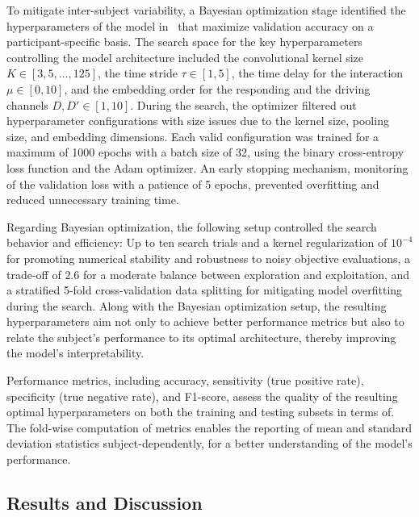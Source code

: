 To mitigate inter-subject variability, a Bayesian optimization stage identified the hyperparameters of the model in~ that maximize validation accuracy on a participant-specific basis. The search space for the key hyperparameters controlling the model architecture included the convolutional kernel size $K\in[3,5,\dots,125]$, the time stride $\tau\in[1,5]$, the time delay for the interaction $\mu\in[0,10]$, and the embedding order for the responding and the driving channels $D,D'\in[1,10]$. During the search, the optimizer filtered out hyperparameter configurations with size issues due to the kernel size, pooling size, and embedding dimensions. Each valid configuration was trained for a maximum of 1000 epochs with a batch size of 32, using the binary cross-entropy loss function and the Adam optimizer. An early stopping mechanism, monitoring of the validation loss with a patience of 5 epochs, prevented overfitting and reduced unnecessary training time.

Regarding Bayesian optimization, the following setup controlled the search behavior and efficiency: Up to ten search trials and a kernel regularization of $10^{-4}$ for promoting numerical stability and robustness to noisy objective evaluations, a trade-off of $2.6$ for a moderate balance between exploration and exploitation, and a stratified 5-fold cross-validation data splitting for mitigating model overfitting during the search. Along with the Bayesian optimization setup, the resulting hyperparameters aim not only to achieve better performance metrics but also to relate the subject's performance to its optimal architecture, thereby improving the model's interpretability. 

Performance metrics, including accuracy, sensitivity (true positive rate), specificity (true negative rate), and F1-score, assess the quality of the resulting optimal hyperparameters on both the training and testing subsets in terms of. The fold-wise computation of metrics enables the reporting of mean and standard deviation statistics subject-dependently, for a better understanding of the model's performance.


\subsection{ Results and Discussion} \label{sec:Results2}

